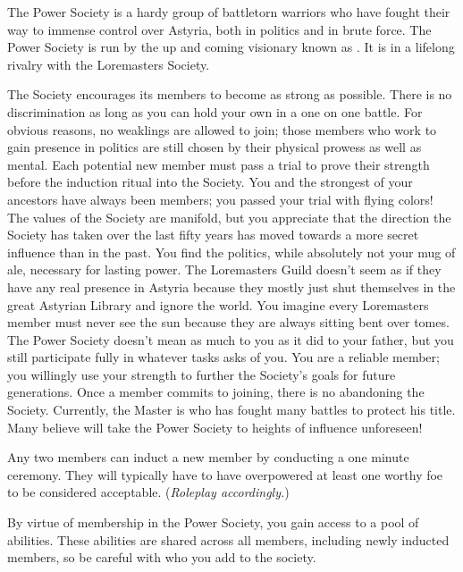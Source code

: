 \documentclass[blue]{guildcamp2}
\begin{document}
\name{\bPower{}}


The Power Society is a hardy group of battletorn warriors who have fought their way to immense control over Astyria, both in politics and in brute force. The Power Society is run by the up and coming visionary known as \cRed{}. It is in a lifelong rivalry with the Loremasters Society.

The Society encourages its members to become as strong as possible. There is no discrimination as long as you can hold your own in a one on one battle. For obvious reasons, no weaklings are allowed to join; those members who work to gain presence in politics are still chosen by their physical prowess as well as mental. Each potential new member must pass a trial to prove their strength before the induction ritual into the Society. You and the strongest of your ancestors have always been members; you passed your trial with flying colors! The values of the Society are manifold, but you appreciate that the direction the Society has taken over the last fifty years has moved towards a more secret influence than in the past. You find the politics, while absolutely not your mug of ale, necessary for lasting power. The Loremasters Guild doesn't seem as if they have any real presence in Astyria because they mostly just shut themselves in the great Astyrian Library and ignore the world. You imagine every Loremasters member must never see the sun because they are always sitting bent over tomes. The Power Society doesn't mean as much to you as it did to your father, but you still participate fully in whatever tasks \cRed{} asks of you. You are a reliable member; you willingly use your strength to further the Society's goals for future generations. Once a member commits to joining, there is no abandoning the Society. Currently, the Master is \cRed{} who has fought many battles to protect his title. Many believe \cRed{} will take the Power Society to heights of influence unforeseen!

Any two members can induct a new member by conducting a one minute ceremony. They will typically have to have overpowered at least one worthy foe to be considered acceptable. (\emph{Roleplay accordingly.})

By virtue of membership in the Power Society, you gain access to a pool of abilities. These abilities are shared across all members, including newly inducted members, so be careful with who you add to the society.
\end{document}
